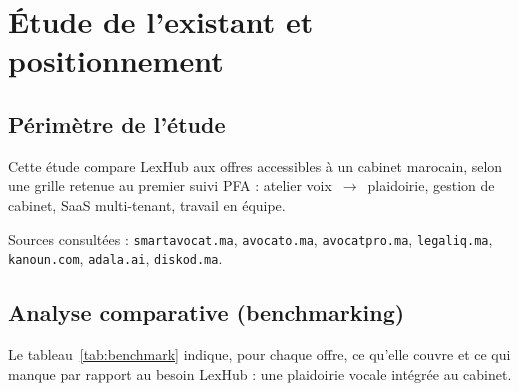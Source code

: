 \chapter{Étude de l'existant et positionnement}
\label{ch:etat-art}

\section{Périmètre de l'étude}

Cette étude compare LexHub aux offres accessibles à un cabinet marocain, selon une grille retenue au premier suivi PFA : atelier voix~$\rightarrow$~plaidoirie, gestion de cabinet, SaaS multi-tenant, travail en équipe.

Sources consultées : \texttt{smartavocat.ma}, \texttt{avocato.ma}, \texttt{avocatpro.ma}, \texttt{legaliq.ma}, \texttt{kanoun.com}, \texttt{adala.ai}, \texttt{diskod.ma}.

\section{Analyse comparative (benchmarking)}
\label{sec:benchmark}

Le tableau~\ref{tab:benchmark} indique, pour chaque offre, ce qu'elle couvre et ce qui manque par rapport au besoin LexHub : une plaidoirie vocale intégrée au cabinet.

